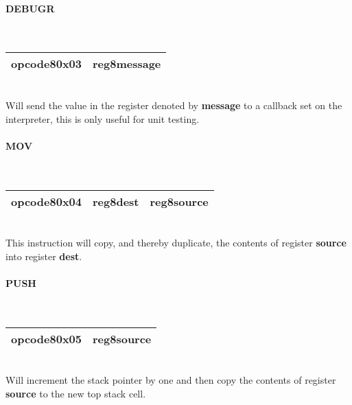 \documentclass[12pt,a4paper]{article}
\begin{document}
\vspace{2em}\begin{minipage}{\textwidth}
\paragraph{DEBUGR}
~\vspace{1em}\\\begin{tabular}{|p{2cm}|p{2cm}|}
\hline
opcode8\newline\textbf{0x03} & reg8\newline\textbf{message} \\
\hline
\end{tabular}\vspace{1em}\\
Will send the value in the register denoted by \textbf{message} to a callback
set on the interpreter, this is only useful for unit testing.
\end{minipage}

\vspace{2em}\begin{minipage}{\textwidth}
\paragraph{MOV}
~\vspace{1em}\\\begin{tabular}{|p{2cm}|p{2cm}|p{2cm}|}
\hline
opcode8\newline\textbf{0x04} & reg8\newline\textbf{dest} & reg8\newline\textbf{source}\\
\hline
\end{tabular}\vspace{1em}\\
This instruction will copy, and thereby duplicate, the contents of register \textbf{source} into register \textbf{dest}.
\end{minipage}

\vspace{2em}\begin{minipage}{\textwidth}
\paragraph{PUSH}
~\vspace{1em}\\\begin{tabular}{|p{2cm}|p{2cm}|}
\hline
opcode8\newline\textbf{0x05} & reg8\newline\textbf{source} \\
\hline
\end{tabular}\vspace{1em}\\
Will increment the stack pointer by one and then copy the contents of register \textbf{source} to the new top stack cell.
\end{minipage}
\end{document}
